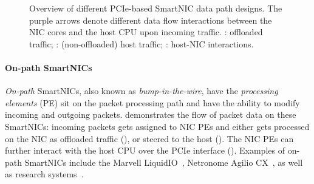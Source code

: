 \begin{figure}[tp]
    \quad
    \caption[Overview of different SmartNIC data path designs]{Overview of different PCIe-based SmartNIC data path designs.  The purple arrows denote different data flow interactions between the NIC cores and the host CPU upon incoming traffic.  : offloaded traffic; : (non-offloaded) host traffic; : host-NIC interactions.} \label{fig:smartnic-datapaths}
\end{figure}

\paragraph{On-path SmartNICs} \emph{On-path} SmartNICs, also known as \emph{bump-in-the-wire}, have the \emph{processing elements} (PE) sit on the packet processing path and have the ability to modify incoming and outgoing packets.   demonstrates the flow of packet data on these SmartNICs: incoming packets gets assigned to NIC PEs and either gets processed on the NIC as offloaded traffic (), or steered to the host ().  The NIC PEs can further interact with the host CPU over the PCIe interface ().  Examples of on-path SmartNICs include the Marvell LiquidIO~\cite{noauthor_marvell_nodate}, Netronome Agilio CX~\cite{noauthor_agilio_nodate}, as well as research systems~\cite{guo_framework_2022, wang_fpganic_2022}.

